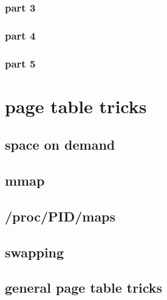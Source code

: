 \subsubsection{part 3}


\subsubsection{part 4}

\subsubsection{part 5}



\section{page table tricks}

\subsection{space on demand}


\subsection{mmap}


\subsection{/proc/PID/maps}


\subsection{swapping}




\subsection{general page table tricks}



